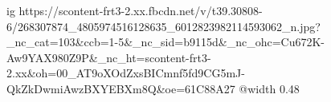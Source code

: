  
 
 
 
 

\ifcmt
  ig https://scontent-frt3-2.xx.fbcdn.net/v/t39.30808-6/268307874_4805974516128635_6012823982114593062_n.jpg?_nc_cat=103&ccb=1-5&_nc_sid=b9115d&_nc_ohc=Cu672K-Aw9YAX980Z9P&_nc_ht=scontent-frt3-2.xx&oh=00_AT9oXOdZxsBICmnf5fd9CG5mJ-QkZkDwmiAwzBXYEBXm8Q&oe=61C88A27
  @width 0.48
\fi
